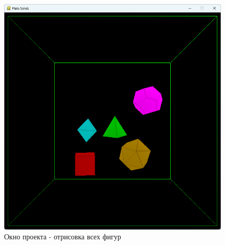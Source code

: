\documentclass[12pt, a4paper]{article}
\begin{document}
\begin{figure}[h]
	\centering
	\includegraphics[scale=.6]{all}
	\caption{Окно проекта - отрисовка всех фигур}
	\label{fig:mesh1}
\end{figure}
\end{document}
